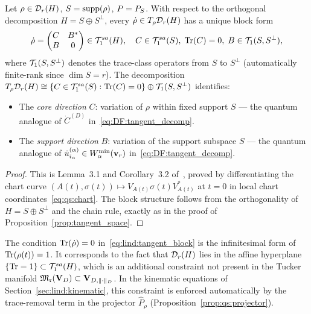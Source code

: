 \begin{proposition}
\label{prop:lind:tangent}
Let $\rho \in \mathcal{D}_{r}(H)$, $S = \mathrm{supp}(\rho)$, $P = P_{S}$.
With respect to the orthogonal decomposition $H = S \oplus S^\perp$,
every $\dot\rho \in T_\rho \mathcal{D}_{r}(H)$ has a unique block form
\begin{equation}
\label{eq:lind:tangent_block}
    \dot\rho =
    \begin{pmatrix} C & B^* \\ B & 0 \end{pmatrix}
    \in \mathcal{T}_{1}^{sa}(H),
    \quad C \in \mathcal{T}_{1}^{sa}(S),\; \mathrm{Tr}(C) = 0,\;
    B \in \mathcal{T}_{1}(S, S^\perp),
\end{equation}
where $\mathcal{T}_{1}(S, S^\perp)$ denotes the trace-class operators from
$S$ to $S^\perp$ (automatically finite-rank since $\dim S = r$).
The decomposition $T_\rho \mathcal{D}_{r}(H) \cong \{C \in \mathcal{T}_{1}^{sa}(S) :
\mathrm{Tr}(C) = 0\} \oplus \mathcal{T}_{1}(S, S^\perp)$ identifies:
\begin{itemize}
\item The \emph{core direction} $C$: variation of $\rho$ within fixed
    support $S$ — the quantum analogue of $\dot{C}^{(D)}$ in~\eqref{eq:DF:tangent_decomp}.
\item The \emph{support direction} $B$: variation of the support
    subspace $S$ — the quantum analogue of $\dot{u}^{(\alpha)}_{i_\alpha}
    \in W^{\min}_{\alpha}(\mathbf{v}_r)$ in~\eqref{eq:DF:tangent_decomp}.
\end{itemize}
\end{proposition}

\begin{proof}
This is Lemma~3.1 and Corollary~3.2 of~\cite{AcevedoFalco2026},
proved by differentiating the chart curve $(A(t), \sigma(t))
\mapsto V_{A(t)}\sigma(t)V_{A(t)}^*$ at $t=0$ in local chart
coordinates~\eqref{eq:qs:chart}. The block structure follows from
the orthogonality of $H = S \oplus S^\perp$ and the chain rule,
exactly as in the proof of Proposition~\ref{prop:tangent_space}.
\end{proof}

\begin{remark}
\label{rem:lind:trace_constraint}
The condition $\mathrm{Tr}(\dot\rho) = 0$ in~\eqref{eq:lind:tangent_block}
is the infinitesimal form of $\mathrm{Tr}(\rho(t)) = 1$. It corresponds to
the fact that $\mathcal{D}_{r}(H)$ lies in the affine hyperplane
$\{\mathrm{Tr} = 1\} \subset \mathcal{T}_{1}^{sa}(H)$, which is an additional constraint
not present in the Tucker manifold $\mathfrak{M}_{\mathfrak{r}}(\mathbf{V}_D) \subset \mathbf{V}_{D,\|\cdot\|_D}$.
In the kinematic equations of Section~\ref{sec:lind:kinematic},
this constraint is enforced automatically by the trace-removal term
in the projector $\hat{P}_\rho$ (Proposition~\ref{prop:qs:projector}).
\end{remark}

